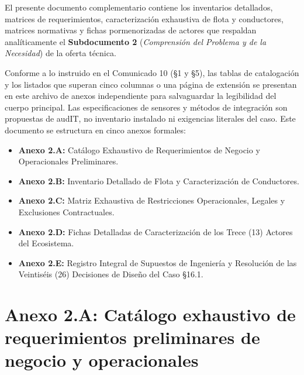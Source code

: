 
El presente documento complementario contiene los inventarios detallados, matrices de requerimientos, caracterización exhaustiva de flota y conductores, matrices normativas y fichas pormenorizadas de actores que respaldan analíticamente el \textbf{Subdocumento 2} (\textit{Comprensión del Problema y de la Necesidad}) de la oferta técnica.

Conforme a lo instruido en el Comunicado 10 (§1 y §5), las tablas de catalogación y los listados que superan cinco columnas o una página de extensión se presentan en este archivo de anexos independiente para salvaguardar la legibilidad del cuerpo principal. Las especificaciones de sensores y métodos de integración son propuestas de audIT, no inventario instalado ni exigencias literales del caso. Este documento se estructura en cinco anexos formales:
\begin{itemize}
  \item \textbf{Anexo 2.A:} Catálogo Exhaustivo de Requerimientos de Negocio y Operacionales Preliminares.
  \item \textbf{Anexo 2.B:} Inventario Detallado de Flota y Caracterización de Conductores.
  \item \textbf{Anexo 2.C:} Matriz Exhaustiva de Restricciones Operacionales, Legales y Exclusiones Contractuales.
  \item \textbf{Anexo 2.D:} Fichas Detalladas de Caracterización de los Trece (13) Actores del Ecosistema.
  \item \textbf{Anexo 2.E:} Registro Integral de Supuestos de Ingeniería y Resolución de las Veintiséis (26) Decisiones de Diseño del Caso §16.1.
\end{itemize}

\vspace{0.5cm}

\section*{Anexo 2.A: Catálogo exhaustivo de requerimientos preliminares de negocio y operacionales}\label{sec:2-anexo-2a}

